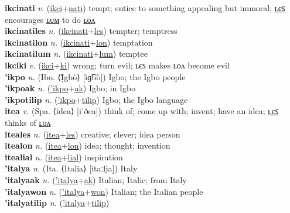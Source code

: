 \textbf{ikcinati} \textit{v.} (\hyperref[ikci]{ikci}+\hyperref[nati]{nati})
tempt; entice to something appealing but immoral; \hyperref[ikcinatiles]{ʟєꜱ} encourages \hyperref[ikcinatilum]{ʟᴜᴍ} to do \hyperref[ikcinatilon]{ʟᴏᴧ} \label{ikcinati} \\
\textbf{ikcinatiles} \textit{n.} (\hyperref[ikcinati]{ikcinati}+\hyperref[les]{les})
tempter; temptress \label{ikcinatiles} \\
\textbf{ikcinatilon} \textit{n.} (\hyperref[ikcinati]{ikcinati}+\hyperref[lon]{lon})
temptation \label{ikcinatilon} \\
\textbf{ikcinatilum} \textit{n.} (\hyperref[ikcinati]{ikcinati}+\hyperref[lum]{lum})
temptee \label{ikcinatilum} \\
\textbf{ikciki} \textit{v.} (\hyperref[ikci]{ikci}+\hyperref[ki]{ki})
wrong; turn evil; ʟєꜱ makes ʟᴏᴧ become evil \label{ikciki} \\
\textbf{'ikpo} \textit{n.} (Ibo. ⟨Ị̀gbò⟩ [ìɡ͡bò])
Igbo; the Igbo people \label{'ikpo} \\
\textbf{'ikpoak} \textit{n.} (\hyperref['ikpo]{'ikpo}+\hyperref[ak]{ak})
Igbo; in Igbo \label{'ikpoak} \\
\textbf{'ikpotilip} \textit{n.} (\hyperref['ikpo]{'ikpo}+\hyperref[tilip]{tilip})
Igbo; the Igbo language \label{'ikpotilip} \\
\textbf{itea} \textit{v.} (Spa. ⟨idea⟩ [iˈðea])
think of; come up with; invent; have an idea; \hyperref[iteales]{ʟєꜱ} thinks of \hyperref[itealon]{ʟᴏᴧ} \label{itea} \\
\textbf{iteales} \textit{n.} (\hyperref[itea]{itea}+\hyperref[les]{les})
creative; clever; idea person \label{iteales} \\
\textbf{itealon} \textit{n.} (\hyperref[itea]{itea}+\hyperref[lon]{lon})
idea; thought; invention \label{itealon} \\
\textbf{itealial} \textit{n.} (\hyperref[itea]{itea}+\hyperref[lial]{lial})
inspiration \label{itealial} \\
\textbf{'italya} \textit{n.} (Ita. ⟨Italia⟩ [itaːlja])
Italy \label{'italya} \\
\textbf{'italyaak} \textit{n.} (\hyperref['italya]{'italya}+\hyperref[ak]{ak})
Italian; Italic; from Italy \label{'italyaak} \\
\textbf{'italyawon} \textit{n.} (\hyperref['italya]{'italya}+\hyperref[won]{won})
Italian; the Italian people \label{'italyawon} \\
\textbf{'italyatilip} \textit{n.} (\hyperref['italya]{'italya}+\hyperref[tilip]{tilip})
